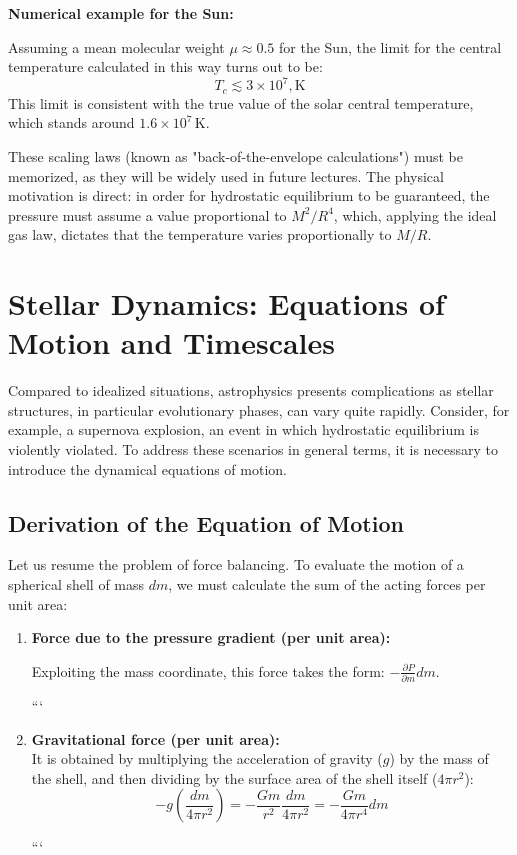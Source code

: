 \textbf{Numerical example for the Sun:}

Assuming a mean molecular weight $\mu \approx 0.5$ for the Sun, the limit for the central temperature calculated in this way turns out to be:
\begin{equation}
T_c \lesssim 3 \times 10^7 , \text{K}
\end{equation}
This limit is consistent with the true value of the solar central temperature, which stands around $1.6 \times 10^7 \, \text{K}$.

These scaling laws (known as "back-of-the-envelope calculations") must be memorized, as they will be widely used in future lectures. The physical motivation is direct: in order for hydrostatic equilibrium to be guaranteed, the pressure must assume a value proportional to $M^2/R^4$, which, applying the ideal gas law, dictates that the temperature varies proportionally to $M/R$.

\section{Stellar Dynamics: Equations of Motion and Timescales}

Compared to idealized situations, astrophysics presents complications as stellar structures, in particular evolutionary phases, can vary quite rapidly. Consider, for example, a supernova explosion, an event in which hydrostatic equilibrium is violently violated. To address these scenarios in general terms, it is necessary to introduce the dynamical equations of motion.

\subsection{Derivation of the Equation of Motion}

Let us resume the problem of force balancing. To evaluate the motion of a spherical shell of mass $dm$, we must calculate the sum of the acting forces per unit area:
\begin{enumerate}
\item \textbf{Force due to the pressure gradient (per unit area):} 

Exploiting the mass coordinate, this force takes the form: $- \frac{\partial P}{\partial m} dm$.

```
\item \textbf{Gravitational force (per unit area):} \\
It is obtained by multiplying the acceleration of gravity ($g$) by the mass of the shell, and then dividing by the surface area of the shell itself ($4\pi r^2$):
\begin{equation}
    - g \left( \frac{dm}{4\pi r^2} \right) = - \frac{G m}{r^2} \frac{dm}{4\pi r^2} = - \frac{G m}{4\pi r^4} dm
\end{equation}


```

\end{enumerate}

